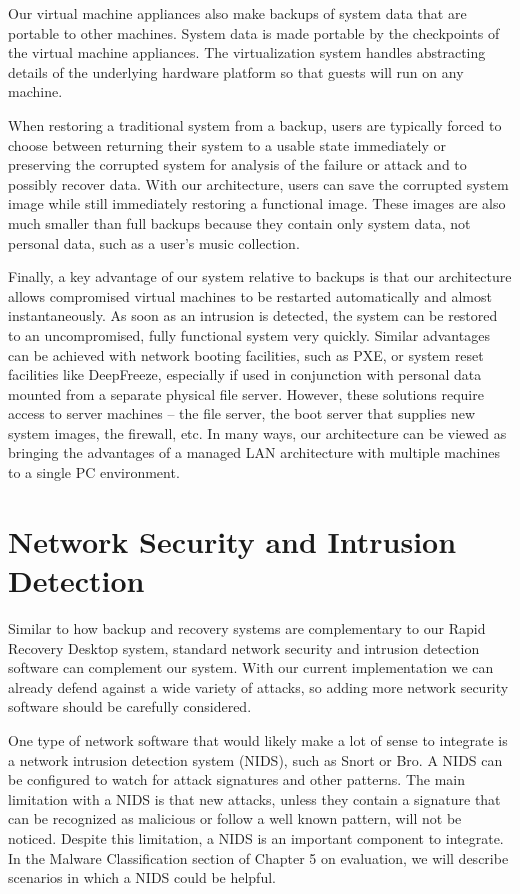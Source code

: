 Our virtual machine appliances also make backups of system data that are portable to other machines. System data is made portable by the checkpoints of the virtual machine appliances. The virtualization system handles abstracting details of the underlying hardware platform so that guests will run on any machine.
 
When restoring a traditional system from a backup, users are typically forced to choose between returning their system to a usable state immediately or preserving the corrupted system for analysis of the failure or attack and to possibly recover data. With our architecture, users can save the corrupted system image while still immediately restoring a functional image. These images are also much smaller than full backups because they contain only system data, not personal data, such as a user’s music collection.
 
Finally, a key advantage of our system relative to backups is that our architecture allows compromised virtual machines to be restarted automatically and almost instantaneously. As soon as an intrusion is detected, the system can be restored to an uncompromised, fully functional system very quickly. Similar advantages can be achieved with network booting facilities, such as PXE, or system reset facilities like DeepFreeze\cite{deepfreeze_website}, especially if used in conjunction with personal data mounted from a separate physical file server. However, these solutions require access to server machines – the file server, the boot server that supplies new system images, the firewall, etc. In many ways, our architecture can be viewed as bringing the advantages of a managed LAN architecture with multiple machines to a single PC environment.

\section{Network Security and Intrusion Detection}

Similar to how backup and recovery systems are complementary to our Rapid Recovery Desktop system, standard network security and intrusion detection software can complement our system. With our current implementation we can already defend against a wide variety of attacks, so adding more network security software should be carefully considered. 

One type of network software that would likely make a lot of sense to integrate is a network intrusion detection system (NIDS), such as Snort\cite{roesch_1999} or Bro\cite{paxson_1999}. A NIDS can be configured to watch for attack signatures and other patterns. The main limitation with a NIDS is that new attacks, unless they contain a signature that can be recognized as malicious or follow a well known pattern, will not be noticed. Despite this limitation, a NIDS is an important component to integrate. In the Malware Classification section of Chapter 5 on evaluation, we will describe scenarios in which a NIDS could be helpful.

